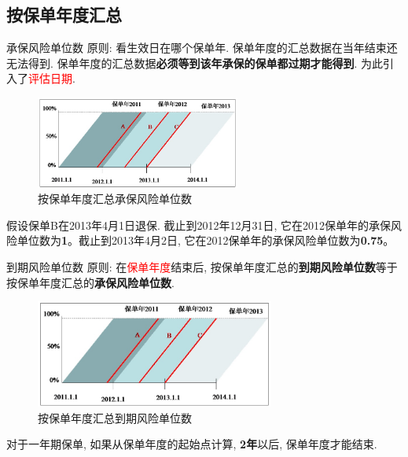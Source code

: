 \documentclass[professionalfont]{beamer}
\newcommand{\red}[1]{\textcolor{red}{#1}}
\newcommand{\green}[1]{\textbf{#1}}
\begin{document}
\subsection{按保单年度汇总}
\begin{frame}{承保风险单位数}
	原则: 看生效日在哪个保单年. 保单年度的汇总数据在当年结束还无法得到. 保单年度的汇总数据\green{必须等到该年承保的保单都过期才能得到}. 为此引入了\red{评估日期}.
		\begin{figure}
			\includegraphics[width=0.6\textwidth]{Plots/policy_year.jpg}
			\caption{按保单年度汇总承保风险单位数}
		\end{figure}
		假设保单B在2013年4月1日退保. 截止到2012年12月31日, 它在2012保单年的承保风险单位数为\green{1}。截止到2013年4月2日, 它在2012保单年的承保风险单位数为\green{0.75}。
\end{frame}
\begin{frame}{到期风险单位数}
	原则: 在\red{保单年度}结束后, 按保单年度汇总的\green{到期风险单位数}等于按保单年度汇总的\green{承保风险单位数}.
		\begin{figure}
				\includegraphics[width=0.7\textwidth]{Plots/policy_year.jpg}
				\caption{按保单年度汇总到期风险单位数}
			\end{figure}
对于一年期保单, 如果从保单年度的起始点计算, \green{2年}以后, 保单年度才能结束.
\end{frame}
\end{document}

